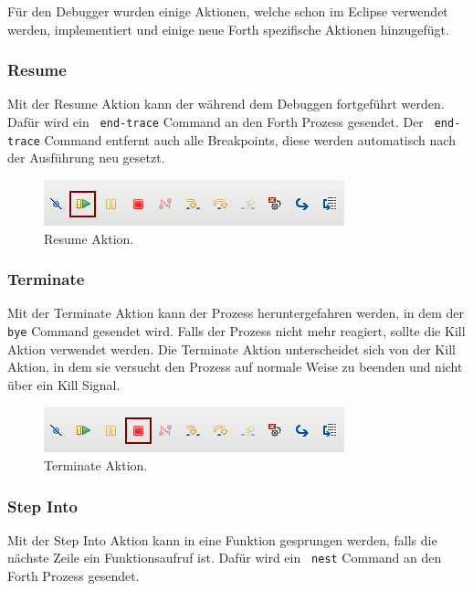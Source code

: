 Für den Debugger wurden einige Aktionen, welche schon im Eclipse verwendet werden, implementiert und einige neue Forth spezifische Aktionen hinzugefügt.

\subsubsection{Resume}

Mit der Resume Aktion kann der während dem Debuggen fortgeführt werden. Dafür wird ein \verb! end-trace! Command an den Forth Prozess gesendet. Der \verb! end-trace! Command entfernt auch alle Breakpoints, diese werden automatisch nach der Ausführung neu gesetzt. 

\begin{figure}[H]
	\centering
		\includegraphics[scale=1]{debugger/resume.png}
		\caption{Resume Aktion.}
		\label{fig:resume}
\end{figure}

\subsubsection{Terminate}

Mit der Terminate Aktion kann der Prozess heruntergefahren werden, in dem der \verb! bye! Command gesendet wird. Falls der Prozess nicht mehr reagiert, sollte die Kill Aktion verwendet werden. Die Terminate Aktion unterscheidet sich von der Kill Aktion, in dem sie versucht den Prozess auf normale Weise zu beenden und nicht über ein Kill Signal.

\begin{figure}[H]
	\centering
		\includegraphics[scale=1]{debugger/terminate.png}
		\caption{Terminate Aktion.}
		\label{fig:terminate}
\end{figure}

\subsubsection{Step Into}

Mit der Step Into Aktion kann in eine Funktion gesprungen werden, falls die nächste Zeile ein Funktionsaufruf ist. Dafür wird ein \verb! nest! Command an den Forth Prozess gesendet.

